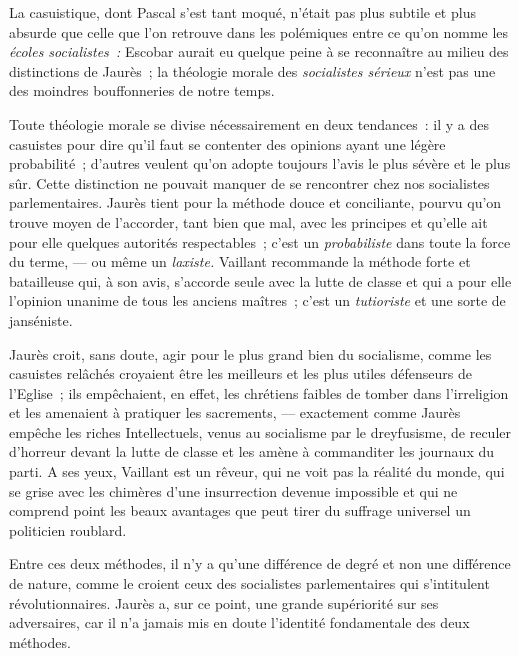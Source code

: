 \documentclass[french,twoside]{book} %
\begin{document}
\noindent La casuistique, dont Pascal s’est tant moqué, n’était pas plus subtile et plus absurde que celle que l’on retrouve dans les polémiques entre ce qu’on nomme les \emph{écoles socialistes :} Escobar aurait eu quelque peine à se reconnaître au milieu des distinctions de Jaurès ; la théologie morale des \emph{socialistes sérieux} n’est pas une des moindres bouffonneries de notre temps.\par
Toute théologie morale se divise nécessairement en deux tendances : il y a des casuistes pour dire qu’il faut se contenter des opinions ayant une légère probabilité ; d’autres veulent qu’on adopte toujours l’avis le plus sévère et le plus sûr. Cette distinction ne pouvait manquer de se rencontrer chez nos socialistes parlementaires. Jaurès tient pour la méthode douce et conciliante, pourvu qu’on trouve moyen de l’accorder, tant bien que mal,  avec les principes et qu’elle ait pour elle quelques autorités respectables ; c’est un \emph{probabiliste} dans toute la force du terme, — ou même un \emph{laxiste.} Vaillant recommande la méthode forte et batailleuse qui, à son avis, s’accorde seule avec la lutte de classe et qui a pour elle l’opinion unanime de tous les anciens maîtres ; c’est un \emph{tutioriste} et une sorte de janséniste.\par
Jaurès croit, sans doute, agir pour le plus grand bien du socialisme, comme les casuistes relâchés croyaient être les meilleurs et les plus utiles défenseurs de l’Eglise ; ils empêchaient, en effet, les chrétiens faibles de tomber dans l’irreligion et les amenaient à pratiquer les sacrements, — exactement comme Jaurès empêche les riches Intellectuels, venus au socialisme par le dreyfusisme, de reculer d’horreur devant la lutte de classe et les amène à commanditer les journaux du parti. A ses yeux, Vaillant est un rêveur, qui ne voit pas la réalité du monde, qui se grise avec les chimères d’une insurrection devenue impossible et qui ne comprend point les beaux avantages que peut tirer du suffrage universel un politicien roublard.\par
Entre ces deux méthodes, il n’y a qu’une différence de degré et non une différence de nature, comme le croient ceux des socialistes parlementaires qui s’intitulent révolutionnaires. Jaurès a, sur ce point, une grande supériorité sur ses adversaires, car il n’a jamais mis en doute l’identité fondamentale des deux méthodes.\par
\end{document}
